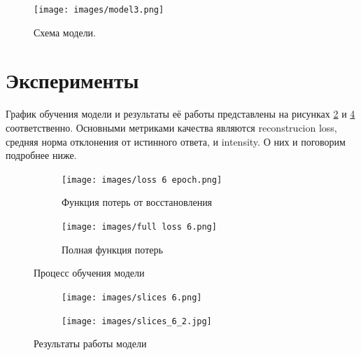 \documentclass{article}
\begin{document}
\begin{figure}[h]
    \centering
    \texttt{[image: images/model3.png]}
    \caption{Схема модели.}
    \label{fig:scheme}
\end{figure}


\section{Эксперименты}
График обучения модели и результаты её работы представлены на рисунках \ref{pic:training} и \ref{pic:slices} соответственно. Основными метриками качества являются reconstrucion loss, средняя норма отклонения от истинного ответа, и intensity. О них и поговорим подробнее ниже.   
\begin{figure}[h!]
      \centering
      
        \begin{subfigure}[b]{0.4\linewidth}
        \texttt{[image: images/loss 6 epoch.png]} 
        \caption{Функция потерь от восстановления}
       \label{pic:training}
        \end{subfigure}
        \begin{subfigure}[b]{0.4\linewidth}
        \texttt{[image: images/full loss 6.png]} 
        \caption{Полная функция потерь}
        
        \end{subfigure}
        \caption{Процесс обучения модели}
        \label{loss}
        
\end{figure}
\begin{figure}[h!]
      \centering
      
        \begin{subfigure}[b]{0.4\linewidth}
        \texttt{[image: images/slices 6.png]} 
        \label{pic:slices}
        
        \end{subfigure}
        \begin{subfigure}[b]{0.4\linewidth}
        \texttt{[image: images/slices\_6\_2.jpg]} 
      
        
        \end{subfigure}
        \caption{Результаты работы модели}
        \label{res}
\end{figure}
\end{document}
